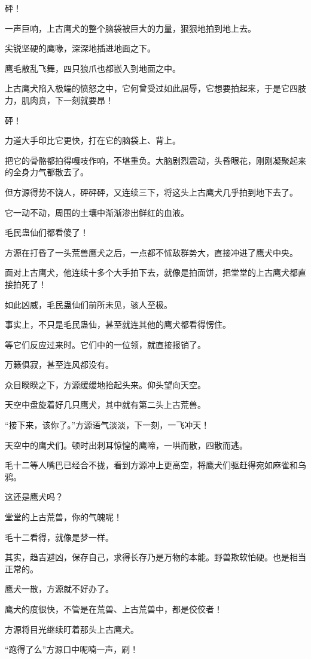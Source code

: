 \begin{this_body}
砰！

一声巨响，上古鹰犬的整个脑袋被巨大的力量，狠狠地拍到地上去。

尖锐坚硬的鹰喙，深深地插进地面之下。

鹰毛散乱飞舞，四只狼爪也都嵌入到地面之中。

上古鹰犬陷入极端的愤怒之中，它何曾受过如此屈辱，它想要拍起来，于是它四肢力，肌肉贲，下一刻就要昂！

砰！

力道大手印比它更快，打在它的脑袋上、背上。

把它的骨骼都拍得嘎吱作响，不堪重负。大脑剧烈震动，头昏眼花，刚刚凝聚起来的全身力气都散去了。

但方源得势不饶人，砰砰砰，又连续三下，将这头上古鹰犬几乎拍到地下去了。

它一动不动，周围的土壤中渐渐渗出鲜红的血液。

毛民蛊仙们都看傻了！

方源在打昏了一头荒兽鹰犬之后，一点都不怵敌群势大，直接冲进了鹰犬中央。

面对上古鹰犬，他连续十多个大手拍下去，就像是拍面饼，把堂堂的上古鹰犬都直接拍死了！

如此凶威，毛民蛊仙们前所未见，骇人至极。

事实上，不只是毛民蛊仙，甚至就连其他的鹰犬都看得愣住。

等它们反应过来时。它们中的一位领，就直接报销了。

万籁俱寂，甚至连风都没有。

众目睽睽之下，方源缓缓地抬起头来。仰头望向天空。

天空中盘旋着好几只鹰犬，其中就有第二头上古荒兽。

“接下来，该你了。”方源语气淡淡，下一刻，一飞冲天！

天空中的鹰犬们。顿时出刺耳惊惶的鹰啼，一哄而散，四散而逃。

毛十二等人嘴巴已经合不拢，看到方源冲上更高空，将鹰犬们驱赶得宛如麻雀和乌鸦。

这还是鹰犬吗？

堂堂的上古荒兽，你的气魄呢！

毛十二看得，就像是梦一样。

其实，趋吉避凶，保存自己，求得长存乃是万物的本能。野兽欺软怕硬。也是相当正常的。

鹰犬一散，方源就不好办了。

鹰犬的度很快，不管是在荒兽、上古荒兽中，都是佼佼者！

方源将目光继续盯着那头上古鹰犬。

“跑得了么”方源口中呢喃一声，刷！


\end{this_body}
